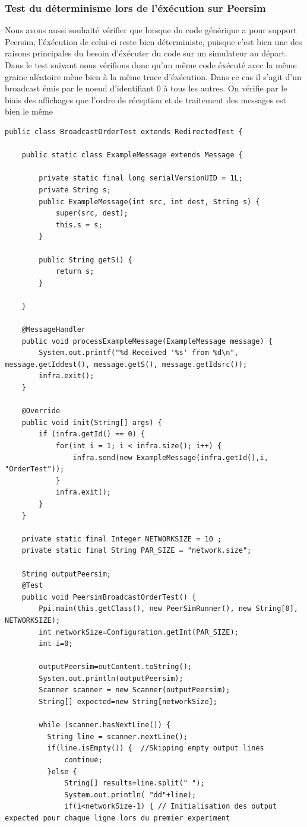 \documentclass{article}
\begin{document}
			\subsubsection{Test du déterminisme lors de l'éxécution sur Peersim}
			Nous avons aussi souhaité vérifier que lorsque du code générique a pour support Peersim, l'éxécution de celui-ci reste bien déterministe, puisque c'est bien une des raisons principales du besoin d'éxécuter du code sur un simulateur au départ. 
Dans le test suivant nous vérifions donc qu'un même code éxécuté avec la même graine aléatoire mène bien à la même trace d'éxécution.\newline
Dans ce cas il s'agit d'un broadcast émis par le noeud d'identifiant 0 à tous les autres. On vérifie par le biais des affichages que l'ordre de réception et de traitement des messages est bien le même
			\begin{lstlisting}
public class BroadcastOrderTest extends RedirectedTest {

	public static class ExampleMessage extends Message {

		private static final long serialVersionUID = 1L;
		private String s;
		public ExampleMessage(int src, int dest, String s) {
			super(src, dest);
			this.s = s;
		}

		public String getS() {
			return s;
		}

	}

	@MessageHandler
	public void processExampleMessage(ExampleMessage message) {
		System.out.printf("%d Received '%s' from %d\n", message.getIddest(), message.getS(), message.getIdsrc());
		infra.exit();
	}

	@Override
	public void init(String[] args) {
		if (infra.getId() == 0) {
			for(int i = 1; i < infra.size(); i++) {
				infra.send(new ExampleMessage(infra.getId(),i, "OrderTest"));
			}
			infra.exit();
		}
	}

	private static final Integer NETWORKSIZE = 10 ;
	private static final String PAR_SIZE = "network.size";

	String outputPeersim;
	@Test
	public void PeersimBroadcastOrderTest() {
		Ppi.main(this.getClass(), new PeerSimRunner(), new String[0], NETWORKSIZE);
		int networkSize=Configuration.getInt(PAR_SIZE);
		int i=0;
		
		outputPeersim=outContent.toString();
		System.out.println(outputPeersim);
		Scanner scanner = new Scanner(outputPeersim);
		String[] expected=new String[networkSize];

		while (scanner.hasNextLine()) {
		  String line = scanner.nextLine();
		  if(line.isEmpty()) {	//Skipping empty output lines
			  continue;
		  }else {
			  String[] results=line.split(" ");
			  System.out.println( "dd"+line);
			  if(i<networkSize-1) { // Initialisation des output expected pour chaque ligne lors du premier experiment
				  

\end{lstlisting}
\end{document}
